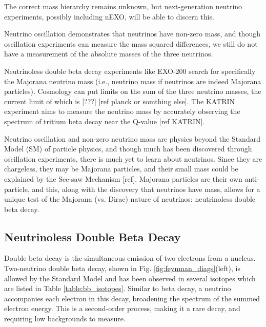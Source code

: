\noindent
The correct mass hierarchy remains unknown, but next-generation neutrino experiments, possibly including nEXO, will be able to discern this.

Neutrino oscillation demonstrates that neutrinos have non-zero mass, and though oscillation experiments can measure the mass squared differences, we still do not have a measurement of the absolute masses of the three neutrinos.

Neutrinoless double beta decay experiments like EXO-200 search for specifically the Majorana neutrino mass (i.e., neutrino mass if neutrinos are indeed Majorana particles).  Cosmology can put limits on the sum of the three neutrino masses, the current limit of which is [???] [ref planck or somthing else].  The KATRIN experiment aims to measure the neutrino mass by accurately observing the spectrum of tritium beta decay near the Q-value [ref KATRIN].

Neutrino oscillation and non-zero neutrino mass are physics beyond the Standard Model (SM) of particle physics, and though much has been discovered through oscillation experiments, there is much yet to learn about neutrinos. Since they are chargeless, they may be Majorana particles, and their small mass could be explained by the See-saw Mechanism [ref]. Majorana particles are their own anti-particle, and this, along with the discovery that neutrinos have mass, allows for a unique test of the Majorana (vs. Dirac) nature of neutrinos: neutrinoless double beta decay.

\subsection{Neutrinoless Double Beta Decay}

Double beta decay is the simultaneous emission of two electrons from a nucleus.  Two-neutrino double beta decay, shown in Fig. \ref{fig:feynman_diags}(left), is allowed by the Standard Model and has been observed in several isotopes which are listed in Table \ref{table:bb_isotopes}.  Similar to beta decay, a neutrino accompanies each electron in this decay, broadening the spectrum of the summed electron energy. This is a second-order process, making it a rare decay, and requiring low backgrounds to measure.

